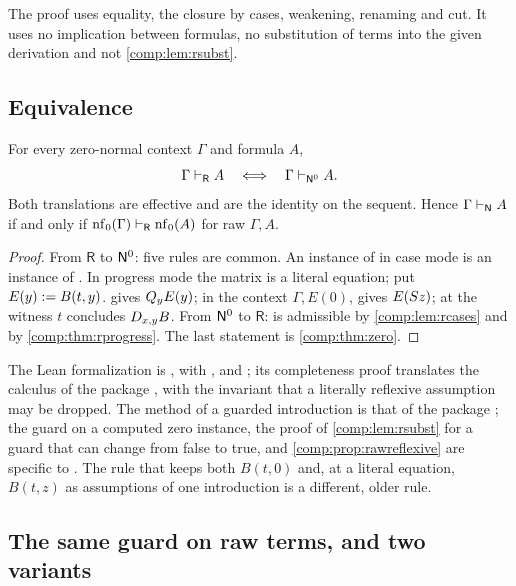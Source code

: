 The proof uses equality, the closure by cases, weakening, renaming and cut.
It uses no implication between formulas, no substitution of terms into the
given derivation and not \cref{comp:lem:rsubst}.

\subsection{Equivalence}

\begin{theorem}
\label{comp:thm:reflexive}
For every zero-normal context $\Gamma$ and formula $A$,
\[
 \Gamma\vdash_{\mathsf R}A
 \quad\Longleftrightarrow\quad
 \Gamma\vdash_{\mathsf{N}^{0}}A .
\]
Both translations are effective and are the identity on the sequent. Hence
$\Gamma\vdash_{\mathsf{N}}A$ if and only if
$\operatorname{nf}_0(\Gamma)\vdash_{\mathsf R}\operatorname{nf}_0(A)$ for raw $\Gamma,A$.
\end{theorem}

\begin{proof}
From $\mathsf{R}$ to $\mathsf{N}^{0}$: five rules are common. An instance of
 in case mode is an instance of . In progress mode
the matrix is a literal equation; put $E(y)\mathrel{:=} B(t,y)$. 
gives $Q_{y}E(y)$; in the context $\Gamma,E(0)$,  gives
$E(S z)$;  at the witness $t$ concludes $D_{x,y}B$. From
$\mathsf{N}^{0}$ to $\mathsf{R}$:  is admissible by
\cref{comp:lem:rcases} and  by \cref{comp:thm:rprogress}. The
last statement is \cref{comp:thm:zero}.
\end{proof}

\begin{remark}
The Lean formalization is , with ,
 and ; its completeness proof
translates the calculus of the package , with the
invariant that a literally reflexive assumption may be dropped. The method
of a guarded introduction is that of the package ; the
guard on a computed zero instance, the proof of
\cref{comp:lem:rsubst} for a guard that can change from false to true, and
\cref{comp:prop:rawreflexive} are specific to . The
rule that keeps both $B(t,0)$ and, at a literal equation, $B(t,z)$ as
assumptions of one introduction is a different, older rule.
\end{remark}

\subsection{The same guard on raw terms, and two variants}

